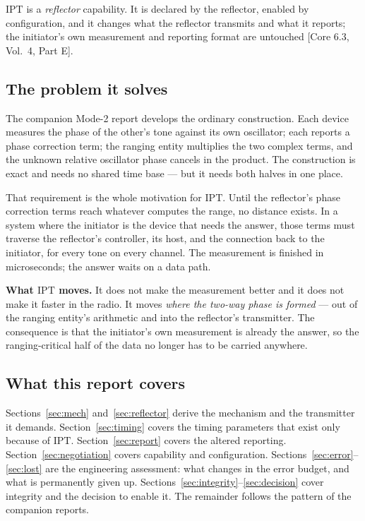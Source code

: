 \documentclass[11pt,a4paper]{article}
\newcommand{\IPT}{\ensuremath{\mathrm{IPT}}}
\newcommand{\core}[1]{\textcolor{rulegrey}{\small[Core 6.3, #1]}}
\begin{document}
\IPT{} is a \emph{reflector} capability. It is declared by the reflector, enabled by configuration,
and it changes what the reflector transmits and what it reports; the initiator's own measurement and
reporting format are untouched \core{Vol.\ 4, Part E}.

\subsection{The problem it solves}

The companion Mode-2 report develops the ordinary construction. Each device measures the phase of the
other's tone against its own oscillator; each reports a phase correction term; the ranging entity
multiplies the two complex terms, and the unknown relative oscillator phase cancels in the product.
The construction is exact and needs no shared time base --- but it needs both halves in one place.

That requirement is the whole motivation for \IPT. Until the reflector's phase correction terms reach
whatever computes the range, no distance exists. In a system where the initiator is the device that
needs the answer, those terms must traverse the reflector's controller, its host, and the connection
back to the initiator, for every tone on every channel. The measurement is finished in microseconds;
the answer waits on a data path.

\begin{callout}
\textbf{What \IPT{} moves.} It does not make the measurement better and it does not make it faster in
the radio. It moves \emph{where the two-way phase is formed} --- out of the ranging entity's
arithmetic and into the reflector's transmitter. The consequence is that the initiator's own
measurement is already the answer, so the ranging-critical half of the data no longer has to be
carried anywhere.
\end{callout}

\subsection{What this report covers}

Sections~\ref{sec:mech} and~\ref{sec:reflector} derive the mechanism and the transmitter it demands.
Section~\ref{sec:timing} covers the timing parameters that exist only because of \IPT.
Section~\ref{sec:report} covers the altered reporting.
Section~\ref{sec:negotiation} covers capability and configuration.
Sections~\ref{sec:error}--\ref{sec:lost} are the engineering assessment: what changes in the error
budget, and what is permanently given up.
Sections~\ref{sec:integrity}--\ref{sec:decision} cover integrity and the decision to enable it.
The remainder follows the pattern of the companion reports.
\end{document}
